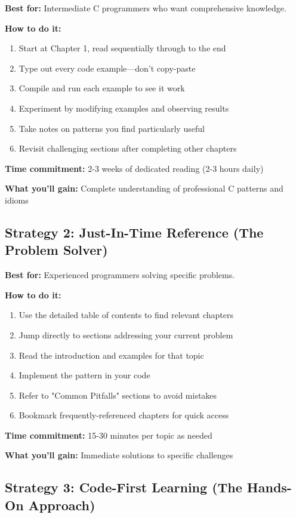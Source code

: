 \documentclass[11pt,openany]{book}
\begin{document}
\textbf{Best for:} Intermediate C programmers who want comprehensive knowledge.

\textbf{How to do it:}
\begin{enumerate}
    \item Start at Chapter 1, read sequentially through to the end
    \item Type out every code example—don't copy-paste
    \item Compile and run each example to see it work
    \item Experiment by modifying examples and observing results
    \item Take notes on patterns you find particularly useful
    \item Revisit challenging sections after completing other chapters
\end{enumerate}

\textbf{Time commitment:} 2-3 weeks of dedicated reading (2-3 hours daily)

\textbf{What you'll gain:} Complete understanding of professional C patterns and idioms

\subsection*{Strategy 2: Just-In-Time Reference (The Problem Solver)}

\textbf{Best for:} Experienced programmers solving specific problems.

\textbf{How to do it:}
\begin{enumerate}
    \item Use the detailed table of contents to find relevant chapters
    \item Jump directly to sections addressing your current problem
    \item Read the introduction and examples for that topic
    \item Implement the pattern in your code
    \item Refer to "Common Pitfalls" sections to avoid mistakes
    \item Bookmark frequently-referenced chapters for quick access
\end{enumerate}

\textbf{Time commitment:} 15-30 minutes per topic as needed

\textbf{What you'll gain:} Immediate solutions to specific challenges

\subsection*{Strategy 3: Code-First Learning (The Hands-On Approach)}
\end{document}

